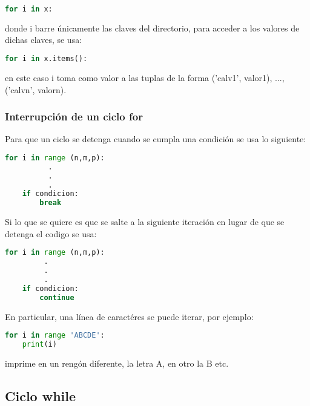 \documentclass[10pt,oneside]{article}
\begin{document}
\begin{multicols}{2}
                \begin{lstlisting}[language=Python]
for i in x:
                \end{lstlisting}

               donde i barre únicamente las claves del directorio, para acceder a los valores de dichas claves, se usa:

                \begin{lstlisting}[language=Python]
for i in x.items():
                \end{lstlisting}

                en este caso i toma como valor a las tuplas de la forma ('calv1', valor1), ..., ('calvn', valorn).\\ \newline
            

            \subsubsection{Interrupción de un ciclo for}

                Para que un ciclo se detenga cuando se cumpla una condición se usa lo siguiente:

                \begin{lstlisting}[language=Python]
for i in range (n,m,p):
          .
          .
          .
    if condicion:
        break
                \end{lstlisting}

                Si lo que se quiere es que se salte a la siguiente iteración en lugar de que se detenga el codigo se usa:

                \begin{lstlisting}[language=Python]
for i in range (n,m,p):
         .
         .
         .
    if condicion:
        continue
                \end{lstlisting}

                En particular, una línea de caractéres se puede iterar, por ejemplo:
                
                \begin{lstlisting}[language=Python]
for i in range 'ABCDE':
    print(i)
                \end{lstlisting}

                imprime en un rengón diferente, la letra A, en otro la B etc.
            
            \subsection{Ciclo while}


\end{multicols}
\end{document}
